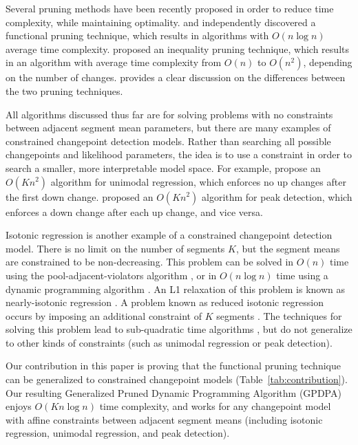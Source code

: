 \documentclass{article}
\begin{document}
Several pruning methods have been recently proposed in order to reduce
time complexity, while maintaining optimality.  \citet{pruned-dp} and
\citet{phd-johnson} independently discovered a functional pruning
technique, which results in algorithms with $O(n\log n)$ average time
complexity. \citet{pelt} proposed an inequality pruning technique,
which results in an algorithm with average time complexity from $O(n)$
to $O(n^2)$, depending on the number of changes. \citet{fpop} provides
a clear discussion on the differences between the two pruning
techniques.

All algorithms discussed thus far are for solving problems with no
constraints between adjacent segment mean parameters, but there are
many examples of constrained changepoint detection models. Rather
than searching all possible changepoints and likelihood parameters,
the idea is to use a constraint in order to search a smaller, more
interpretable model space. For example, \citet{haiminen2008algorithms}
propose an $O(Kn^2)$ algorithm for unimodal regression, which enforces
no up changes after the first down change. \citet{HOCKING-PeakSeg}
proposed an $O(Kn^2)$ algorithm for peak detection, which enforces a
down change after each up change, and vice versa.

Isotonic regression is another example of a constrained changepoint
detection model. There is no limit on the number of segments $K$, but
the segment means are constrained to be non-decreasing. This problem
can be solved in $O(n)$ time using the pool-adjacent-violators
algorithm \citep{mair2009isotone}, or in $O(n\log n)$ time using a
dynamic programming algorithm \citep{isotonic-dp}. An L1 relaxation of
this problem is known as nearly-isotonic regression
\citep{tibshirani2011nearly}. A problem known as reduced isotonic
regression occurs by imposing an additional constraint of $K$ segments
\citep{reduced-monotonic-regression}. The techniques for solving this
problem lead to sub-quadratic time algorithms
\citep{hardwick2014optimal}, but do not generalize to other kinds of
constraints (such as unimodal regression or peak detection).

Our contribution in this paper is proving that the functional pruning
technique can be generalized to constrained changepoint models
(Table~\ref{tab:contribution}). Our resulting Generalized Pruned
Dynamic Programming Algorithm (GPDPA) enjoys $O(Kn\log n)$ time
complexity, and works for any changepoint model with affine
constraints between adjacent segment means (including isotonic
regression, unimodal regression, and peak detection).
\end{document}
